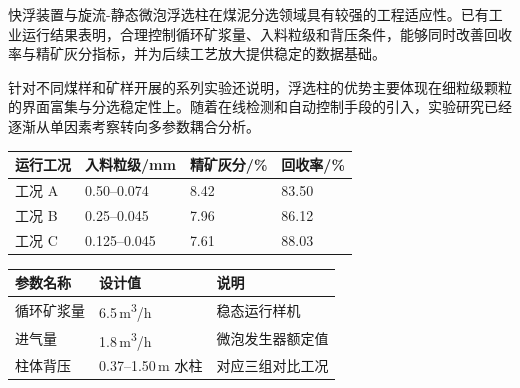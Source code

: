 \label{chap:experiment}


快浮装置与旋流-静态微泡浮选柱在煤泥分选领域具有较强的工程适应性。已有工业运行结果表明，合理控制循环矿浆量、入料粒级和背压条件，能够同时改善回收率与精矿灰分指标，并为后续工艺放大提供稳定的数据基础。

\vspace{0.4\baselineskip}

针对不同煤样和矿样开展的系列实验还说明，浮选柱的优势主要体现在细粒级颗粒的界面富集与分选稳定性上。随着在线检测和自动控制手段的引入，实验研究已经逐渐从单因素考察转向多参数耦合分析。

\begin{table}[H]
    \centering
    \label{tab:industrial-operation}
    \renewcommand{\arraystretch}{1.12}
    \begin{tabular}{C{2.4cm}C{2.4cm}C{2.4cm}C{3.2cm}}
        \toprule
        运行工况 & 入料粒级/mm & 精矿灰分/\% & 回收率/\% \\
        \midrule
        工况 A & 0.50--0.074 & 8.42 & 83.50 \\
        工况 B & 0.25--0.045 & 7.96 & 86.12 \\
        工况 C & 0.125--0.045 & 7.61 & 88.03 \\
        \bottomrule
    \end{tabular}
\end{table}

\vspace{0.6\baselineskip}

\begin{table}[H]
    \centering
    \label{tab:key-parameters}
    \renewcommand{\arraystretch}{1.12}
    \begin{tabular}{C{3.0cm}C{3.2cm}C{4.2cm}}
        \toprule
        参数名称 & 设计值 & 说明 \\
        \midrule
        循环矿浆量 & 6.5\,m\textsuperscript{3}/h & 稳态运行样机 \\
        进气量 & 1.8\,m\textsuperscript{3}/h & 微泡发生器额定值 \\
        柱体背压 & 0.37--1.50\,m 水柱 & 对应三组对比工况 \\
        \bottomrule
    \end{tabular}
\end{table}
